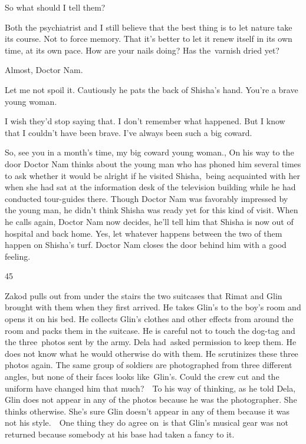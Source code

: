 \documentclass[twoside,11pt]{book}
\begin{document}
{\textquotedbl}So what should I tell them?{\textquotedbl} 

{\textquotedbl}Both the psychiatrist and I still believe that the best thing is to let nature take its course. Not to
force memory. That it's better to let it renew itself in its own time, at its own pace. How are your nails doing? Has
the~varnish dried yet?{\textquotedbl} 

{\textquotedbl}Almost, Doctor Nam.{\textquotedbl} 

{\textquotedbl}Let me not spoil it.{\textquotedbl} Cautiously he pats the back of Shisha's hand. {\textquotedbl}You're a
brave young woman.{\textquotedbl} 

{\textquotedbl}I wish they'd stop saying that. I don't remember what happened. But I know that I couldn't have been
brave. I've always been such a big coward.{\textquotedbl} 

{\textquotedbl}So, see you in a month's time, my big coward young woman.,{\textquotedbl} On his way to the door Doctor
Nam thinks about the young man who has phoned him several times to ask whether it would be alright if he visited
Shisha,\ being acquainted with her when she had sat at the information desk of the television building while he had
conducted tour-guides there. Though Doctor Nam was favorably impressed by the young man, he didn't think Shisha was
ready yet for this kind of visit. When he calls again, Doctor Nam now decides, he'll tell him that Shisha is now out of
hospital and back home. Yes, let whatever happens between the two of them happen on Shisha's turf. Doctor Nam closes
the door behind him with a good feeling.\ 


\bigskip

45\ \ 

Zakod pulls out from under the stairs the two suitcases that Rimat and Glin brought with them when they first arrived.
He takes Glin's to the boy's room and opens it on his bed. He collects Glin's clothes and other effects from around the
room and packs them in the suitcase. He is careful not to touch the dog-tag and the three~photos sent by the army. Dela
had~asked permission to keep them. He does not know what he would otherwise do with them. He scrutinizes these three
photos again. The same group of soldiers are photographed from three different angles, but none of their faces looks
like\ Glin's. Could the crew cut and the uniform have changed him that much?\ \ To his way of thinking, as he told
Dela, Glin does not appear in any of the photos because he was the photographer. She thinks otherwise. She's sure Glin
doesn't appear in any of them because it was not his style.\ \ One thing they do agree on\ is that Glin's musical gear
was not returned because somebody at his base had taken a fancy to it. 
\end{document}
